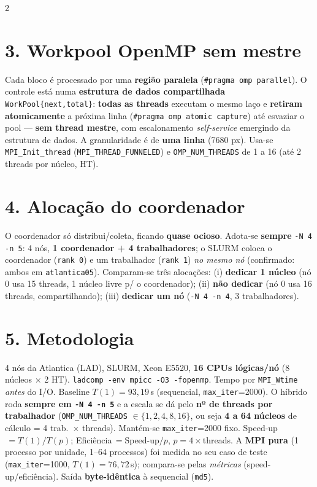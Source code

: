 \documentclass[10pt,a4paper]{article}
\begin{document}
\begin{multicols}{2}
\section*{3. Workpool OpenMP sem mestre}
Cada bloco é processado por uma \textbf{região paralela} (\texttt{\#pragma omp parallel}). O controle está numa \textbf{estrutura de dados compartilhada} \texttt{WorkPool\{next,total\}}: \textbf{todas as threads} executam o mesmo laço e \textbf{retiram atomicamente} a próxima linha (\texttt{\#pragma omp atomic capture}) até esvaziar o pool --- \textbf{sem thread mestre}, com escalonamento \emph{self-service} emergindo da estrutura de dados. A granularidade é de \textbf{uma linha} (7680 px). Usa-se \texttt{MPI\_Init\_thread} (\texttt{MPI\_THREAD\_FUNNELED}) e \texttt{OMP\_NUM\_THREADS} de 1 a 16 (até 2 threads por núcleo, HT).

\section*{4. Alocação do coordenador}
O coordenador só distribui/coleta, ficando \textbf{quase ocioso}. Adota-se \textbf{sempre} \texttt{-N 4 -n 5}: 4 nós, \textbf{1 coordenador + 4 trabalhadores}; o SLURM coloca o coordenador (\texttt{rank 0}) e um trabalhador (\texttt{rank 1}) \emph{no mesmo nó} (confirmado: ambos em \texttt{atlantica05}). Comparam-se três alocações: (i) \textbf{dedicar 1 núcleo} (nó 0 usa 15 threads, 1 núcleo livre p/ o coordenador); (ii) \textbf{não dedicar} (nó 0 usa 16 threads, compartilhando); (iii) \textbf{dedicar um nó} (\texttt{-N 4 -n 4}, 3 trabalhadores).

\section*{5. Metodologia}
4 nós da Atlantica (LAD), SLURM, Xeon E5520, \textbf{16 CPUs lógicas/nó} (8 núcleos $\times$ 2 HT). \texttt{ladcomp -env mpicc -O3 -fopenmp}. Tempo por \texttt{MPI\_Wtime} \emph{antes} do I/O. Baseline $T(1)=93{,}19$\,s (sequencial, \texttt{max\_iter}=2000). O híbrido roda \textbf{sempre em \texttt{-N 4 -n 5}} e a escala se dá pelo \textbf{nº de threads por trabalhador} (\texttt{OMP\_NUM\_THREADS} $\in\{1,2,4,8,16\}$, ou seja \textbf{4 a 64 núcleos} de cálculo = 4 trab.\ $\times$ threads). Mantém-se \texttt{max\_iter}=2000 fixo. Speed-up$\,=T(1)/T(p)$; Eficiência$\,=$Speed-up$/p$, $p=4\times$threads. A \textbf{MPI pura} (1 processo por unidade, 1--64 processos) foi medida no seu caso de teste (\texttt{max\_iter}=1000, $T(1)=76{,}72$\,s); compara-se pelas \emph{métricas} (speed-up/eficiência). Saída \textbf{byte-idêntica} à sequencial (\texttt{md5}).


\end{multicols}
\end{document}
